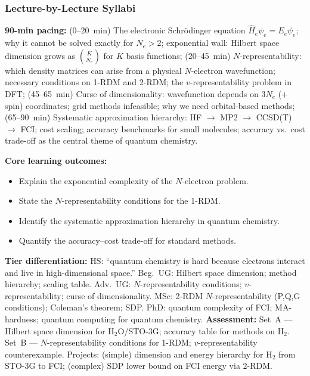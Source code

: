\documentclass[11pt,a4paper]{article}
\begin{document}
\subsubsection*{Lecture-by-Lecture Syllabi}

\begin{tcolorbox}[chembox, title={Module~III.2 / L01: The Quantum Many-Body Problem in Chemistry}]
\textbf{90-min pacing:} (0--20~min) The electronic Schr\"odinger equation $\hat{H}_e\psi_e=E_e\psi_e$; why it cannot be solved exactly for $N_e>2$; exponential wall: Hilbert space dimension grows as $\binom{K}{N_e}$ for $K$ basis functions; (20--45~min) $N$-representability: which density matrices can arise from a physical $N$-electron wavefunction; necessary conditions on 1-RDM and 2-RDM; the $v$-representability problem in DFT; (45--65~min) Curse of dimensionality: wavefunction depends on $3N_e$ (+ spin) coordinates; grid methods infeasible; why we need orbital-based methods; (65--90~min) Systematic approximation hierarchy: HF $\to$ MP2 $\to$ CCSD(T) $\to$ FCI; cost scaling; accuracy benchmarks for small molecules; accuracy vs.\ cost trade-off as the central theme of quantum chemistry.

\medskip\textbf{Core learning outcomes:}
\begin{itemize}[leftmargin=1.4em,topsep=2pt,itemsep=1pt]
  \item Explain the exponential complexity of the $N$-electron problem.
  \item State the $N$-representability conditions for the 1-RDM.
  \item Identify the systematic approximation hierarchy in quantum chemistry.
  \item Quantify the accuracy--cost trade-off for standard methods.
\end{itemize}
\medskip\textbf{Tier differentiation:}
HS: ``quantum chemistry is hard because electrons interact and live in high-dimensional space.''
Beg.\ UG: Hilbert space dimension; method hierarchy; scaling table.
Adv.\ UG: $N$-representability conditions; $v$-representability; curse of dimensionality.
MSc: 2-RDM $N$-representability (P,Q,G conditions); Coleman's theorem; SDP.
PhD: quantum complexity of FCI; MA-hardness; quantum computing for quantum chemistry.
\medskip\textbf{Assessment:}
Set~A --- Hilbert space dimension for H$_2$O/STO-3G; accuracy table for methods on H$_2$.
Set~B --- $N$-representability conditions for 1-RDM; $v$-representability counterexample.
Projects: (simple) dimension and energy hierarchy for H$_2$ from STO-3G to FCI; (complex) SDP lower bound on FCI energy via 2-RDM.
\end{tcolorbox}
\end{document}
